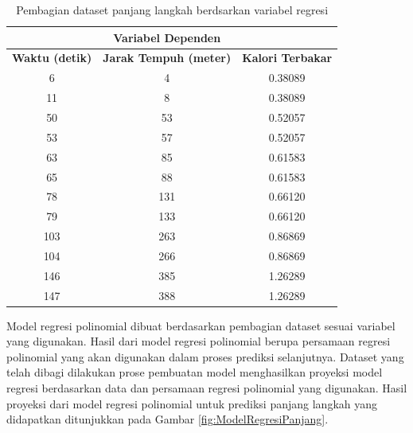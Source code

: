 \begin{longtable}{|c|c|c|}
  \caption{Pembagian dataset panjang langkah berdsarkan variabel regresi}
  \label{tb:VariabelPrediksiPanjang}                                   \\
  \hline
  \rowcolor[HTML]{C0C0C0}
  \multicolumn{2}{|c|}{\textbf{Variabel Independen}}  & \textbf{Variabel Dependen}  \\
  \hline
  \rowcolor[HTML]{C0C0C0}
  \textbf{Waktu (detik)} & \textbf{Jarak Tempuh (meter)} & \textbf{Kalori Terbakar} \\
  \hline
  6    & 4    & 0.38089      \\
  \hline
  11    & 8    & 0.38089     \\
  \hline
  50    & 53    & 0.52057     \\
  \hline
  53    & 57    & 0.52057     \\
  \hline
  63    & 85    & 0.61583     \\
  \hline
  65    & 88    & 0.61583     \\
  \hline
  78    & 131    & 0.66120     \\
  \hline
  79    & 133    & 0.66120     \\
  \hline
  103    & 263    & 0.86869     \\
  \hline
  104    & 266    & 0.86869     \\
  \hline
  146    & 385    & 1.26289     \\
  \hline
  147    & 388    & 1.26289     \\
  \hline
\end{longtable}

Model regresi polinomial dibuat berdasarkan pembagian dataset sesuai variabel yang digunakan. Hasil dari model regresi polinomial berupa persamaan regresi polinomial yang akan digunakan dalam proses prediksi selanjutnya. Dataset yang telah dibagi dilakukan prose pembuatan model menghasilkan proyeksi model regresi berdasarkan data dan persamaan regresi polinomial yang digunakan. Hasil proyeksi dari model regresi polinomial untuk prediksi panjang langkah yang didapatkan ditunjukkan pada Gambar \ref{fig:ModelRegresiPanjang}.

